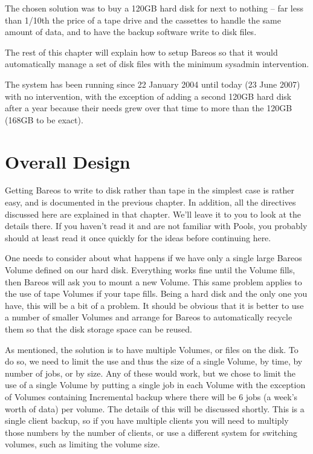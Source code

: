 The chosen solution was to buy a 120GB hard disk for next to nothing -- far
less than 1/10th the price of a tape drive and the cassettes to handle the
same amount of data, and to have the backup software write to disk files.

The rest of this chapter will explain how to setup Bareos so that it would
automatically manage a set of disk files with the minimum sysadmin
intervention.

The system has been running since 22 January 2004 until today
(23 June 2007) with no intervention, with the exception of adding
a second 120GB hard disk after a year because their needs grew
over that time to more than the 120GB (168GB to be exact).

\label{OverallDesign}
\section{Overall Design}

Getting Bareos to write to disk rather than tape in the simplest case is
rather easy, and is documented in the previous chapter. In addition, all the
directives discussed here are explained in that chapter. We'll leave it to you
to look at the details there. If you haven't read it and are not familiar with
Pools, you probably should at least read it once quickly for the ideas before
continuing here.

One needs to consider about what happens if we have only a single large Bareos
Volume defined on our hard disk. Everything works fine until the Volume fills,
then Bareos will ask you to mount a new Volume. This same problem applies to
the use of tape Volumes if your tape fills. Being a hard disk and the only one
you have, this will be a bit of a problem. It should be obvious that it is
better to use a number of smaller Volumes and arrange for Bareos to
automatically recycle them so that the disk storage space can be reused.

As mentioned, the solution is to have multiple Volumes, or files on the disk.
To do so, we need to limit the use and thus the size of a single Volume, by
time, by number of jobs, or by size. Any of these would work, but we chose to
limit the use of a single Volume by putting a single job in each Volume with
the exception of Volumes containing Incremental backup where there will be 6
jobs (a week's worth of data) per volume. The details of this will be
discussed shortly.  This is a single client backup, so if you have multiple
clients you will need to multiply those numbers by the number of clients,
or use a different system for switching volumes, such as limiting the
volume size.

